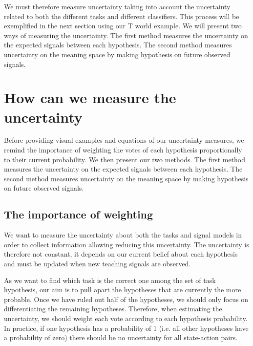 We must therefore measure uncertainty taking into account the uncertainty related to both the different tasks and different classifiers. This process will be exemplified in the next section using our T world example. We will present two ways of measuring the uncertainty. The first method measures the uncertainty on the expected signals between each hypothesis. The second method measures uncertainty on the meaning space by making hypothesis on future observed signals.

\section{How can we measure the uncertainty}
\label{chapter:planning:how}

Before providing visual examples and equations of our uncertainty measures, we remind the importance of weighting the votes of each hypothesis proportionally to their current probability. We then present our two methods. The first method measures the uncertainty on the expected signals between each hypothesis. The second method measures uncertainty on the meaning space by making hypothesis on future observed signals.

\subsection{The importance of weighting}

We want to measure the uncertainty about both the tasks and signal models in order to collect information allowing reducing this uncertainty. The uncertainty is therefore not constant, it depends on our current belief about each hypothesis and must be updated when new teaching signals are observed.

As we want to find which task is the correct one among the set of task hypothesis, our aim is to pull apart the hypotheses that are currently the more probable. Once we have ruled out half of the hypotheses, we should only focus on differentiating the remaining hypotheses. Therefore, when estimating the uncertainty, we should weight each vote according to each hypothesis probability. In practice, if one hypothesis has a probability of 1 (i.e. all other hypotheses have a probability of zero) there should be no uncertainty for all state-action pairs.

